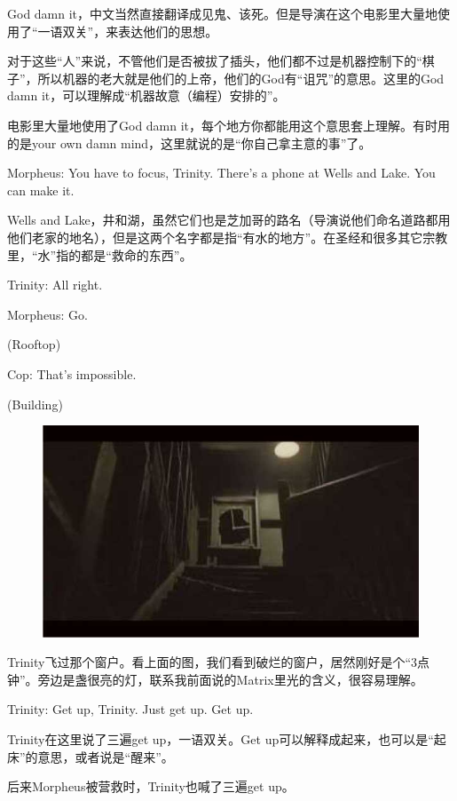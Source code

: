 \documentclass{ctexart}
\newenvironment{myquote}{\color{green} \setlength{\leftskip}{6em} \setlength{\rightskip}{4em} \setlength{\parindent}{-2em}}{\par}
\begin{document}
God damn it，中文当然直接翻译成见鬼、该死。但是导演在这个电影里大量地使用了“一语双关”，来表达他们的思想。

对于这些“人”来说，不管他们是否被拔了插头，他们都不过是机器控制下的“棋子”，所以机器的老大就是他们的上帝，他们的God有“诅咒”的意思。这里的God damn it，可以理解成“机器故意（编程）安排的”。

电影里大量地使用了God damn it，每个地方你都能用这个意思套上理解。有时用的是your own damn mind，这里就说的是“你自己拿主意的事”了。

\begin{myquote}
Morpheus: You have to focus, Trinity. There's a phone at Wells and Lake. You can make it.
\end{myquote}

Wells and Lake，井和湖，虽然它们也是芝加哥的路名（导演说他们命名道路都用他们老家的地名），但是这两个名字都是指“有水的地方”。在圣经和很多其它宗教里，“水”指的都是“救命的东西”。

\begin{myquote}
Trinity: All right.

Morpheus: Go.

(Rooftop)

Cop: That's impossible.

(Building)
\end{myquote}

\begin{figure}[htb]
\centering
\includegraphics[width=0.5\linewidth]{fig/read_Matrix-2}
\end{figure}

Trinity飞过那个窗户。看上面的图，我们看到破烂的窗户，居然刚好是个“3点钟”。旁边是盏很亮的灯，联系我前面说的Matrix里光的含义，很容易理解。

\begin{myquote}
Trinity: Get up, Trinity. Just get up. Get up.
\end{myquote}

Trinity在这里说了三遍get up，一语双关。Get up可以解释成起来，也可以是“起床”的意思，或者说是“醒来”。

后来Morpheus被营救时，Trinity也喊了三遍get up。
\end{document}
